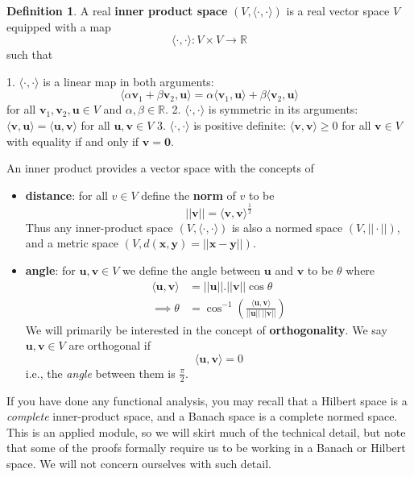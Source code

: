 \documentclass[
]{book}
\theoremstyle{definition}
\newtheorem{definition}{Definition}[chapter]
\theoremstyle{definition}
\theoremstyle{definition}
\theoremstyle{definition}
\theoremstyle{remark}
\begin{document}
\begin{definition}
\protect\hypertarget{def:innerprod}{}{\label{def:innerprod} }A real \textbf{inner product space} \((V, \langle\cdot,\cdot\rangle)\) is a real vector space \(V\) equipped with a map
\[ \langle\cdot,\cdot\rangle : V \times V \rightarrow \mathbb{R}\]
such that
\end{definition}
1. \(\langle\cdot,\cdot\rangle\) is a linear map in both arguments:
\[\langle \alpha \mathbf v_1+\beta \mathbf v_2, \mathbf u\rangle = \alpha \langle \mathbf v_1, \mathbf u\rangle + \beta \langle \mathbf v_2, \mathbf u\rangle\]
for all \(\mathbf v_1, \mathbf v_2, \mathbf u\in V\) and \(\alpha, \beta \in \mathbb{R}\).
2. \(\langle\cdot,\cdot\rangle\) is symmetric in its arguments: \(\langle \mathbf v, \mathbf u\rangle = \langle \mathbf u, \mathbf v\rangle\) for all \(\mathbf u,\mathbf v\in V\)
3. \(\langle\cdot,\cdot\rangle\) is positive definite: \(\langle \mathbf v, \mathbf v\rangle \geq 0\) for all \(\mathbf v\in V\) with equality if and only if \(\mathbf v={\mathbf 0}\).

An inner product provides a vector space with the concepts of

\begin{itemize}
\item
  \textbf{distance}: for all \(v\in V\) define the \textbf{norm} of \(v\) to be \[||\mathbf v|| = \langle \mathbf v, \mathbf v\rangle ^{\frac{1}{2}}\]
  Thus any inner-product space \((V, \langle\cdot,\cdot\rangle)\) is also a normed space \((V, ||\cdot||)\), and a metric space \((V, d(\mathbf x,\mathbf y)=||\mathbf x-\mathbf y||)\).
\item
  \textbf{angle}: for \(\mathbf u, \mathbf v\in V\) we define the angle between \(\mathbf u\) and \(\mathbf v\) to be \(\theta\) where
  \begin{align*}
  \langle \mathbf u,\mathbf v\rangle &= ||\mathbf u||.||\mathbf v||\cos \theta\\
  \implies \theta &= \cos^{-1}\left( \frac{\langle \mathbf u, \mathbf v\rangle}{||\mathbf u|| \;||\mathbf v||}\right)
  \end{align*}
  We will primarily be interested in the concept of \textbf{orthogonality}. We say \(\mathbf u, \mathbf v\in V\) are orthogonal if
  \[\langle \mathbf u, \mathbf v\rangle =0\]
  i.e., the \emph{angle} between them is \(\frac{\pi}{2}\).
\end{itemize}

If you have done any functional analysis, you may recall that a Hilbert space is a \emph{complete} inner-product space, and a Banach space is a complete normed space. This is an applied module, so we will skirt much of the technical detail, but note that some of the proofs formally require us to be working in a Banach or Hilbert space. We will not concern ourselves with such detail.
\end{document}
